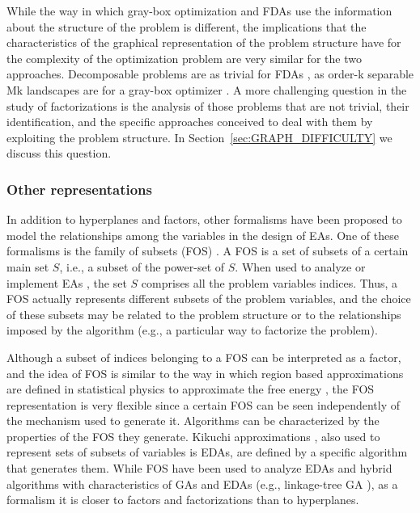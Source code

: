 \documentclass{article} %
\begin{document}
 While the way in which gray-box optimization and FDAs use the information about the structure of the problem is different, the implications that the characteristics of the graphical representation of the problem structure have for the complexity of the optimization problem are very similar for the two approaches. Decomposable problems are as trivial for FDAs \cite{Muhlenbein_et_al:1999}, as order-k separable Mk landscapes  are for a gray-box optimizer \cite{Whitley_et_al:2016}. A more challenging question in the study of factorizations is the analysis of those problems that are not trivial, their identification, and the specific approaches conceived  to deal with them by exploiting the problem structure. In Section~\ref{sec:GRAPH_DIFFICULTY} we discuss this question. 


\subsubsection{Other representations}

 In addition to hyperplanes and factors, other formalisms have been proposed to model the relationships among the variables in the design of EAs. One of these formalisms is the family of subsets (FOS) \cite{Thierens_and_Bosman:2011}. A FOS is a set of subsets of a certain main set $S$, i.e., a subset of the power-set of $S$. When used to analyze or implement EAs  \cite{Bosman_and_Thierens:2012,Thierens:2011,Thierens_and_Bosman:2011,Thierens_and_Bosman:2013,Tung_and_Yu:2015}, the set $S$ comprises all the problem variables indices. Thus, a FOS actually represents  different subsets of the problem variables, and the choice of these subsets may be related to the problem structure or to the relationships imposed by the algorithm (e.g., a particular way to factorize the problem). 

 Although a subset of indices belonging to a FOS can be interpreted as a factor, and the idea of FOS is similar to the way in which region based approximations are defined in statistical physics to approximate the free energy \cite{Kikuchi:1951,Yedidia_et_al:2002a}, the  FOS representation is very flexible since a certain FOS can be seen independently of the mechanism used to generate it. Algorithms can be characterized by the properties of the FOS they generate. Kikuchi approximations \cite{Hoens:2012}, also used to represent sets of subsets of variables is EDAs, are defined by a specific algorithm that generates them. While FOS have been used to analyze EDAs and hybrid algorithms with characteristics of GAs and EDAs (e.g., linkage-tree GA \cite{Thierens:2011}), as a formalism it is closer to factors and factorizations than to hyperplanes. 
\end{document}
